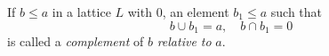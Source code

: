 If $b \leq a$ in a lattice $L$ with $0$, an element $b_1 \leq a$ such that
$$b \cup b_1 = a, \quad b \cap b_1 = 0$$
is called a \emph{complement} of $b$ \emph{relative to} $a$.

